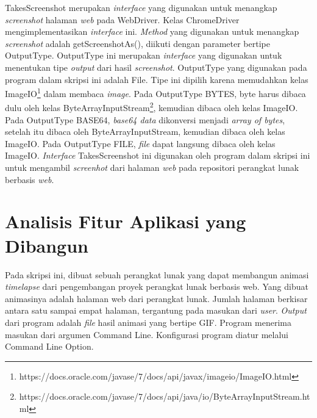 TakesScreenshot merupakan \textit{interface} yang digunakan untuk menangkap \textit{screenshot} halaman \textit{web} pada WebDriver. Kelas ChromeDriver mengimplementasikan \textit{interface} ini. \textit{Method} yang digunakan untuk menangkap \textit{screenshot} adalah getScreenshotAs(), diikuti dengan parameter bertipe OutputType. OutputType ini merupakan \textit{interface} yang digunakan untuk menentukan tipe \textit{output} dari hasil \textit{screenshot}. OutputType yang digunakan pada program dalam skripsi ini adalah File.    
Tipe ini dipilih karena memudahkan kelas ImageIO\footnote{https://docs.oracle.com/javase/7/docs/api/javax/imageio/ImageIO.html} dalam membaca \textit{image}. Pada OutputType BYTES, byte harus dibaca dulu oleh kelas ByteArrayInputStream\footnote{https://docs.oracle.com/javase/7/docs/api/java/io/ByteArrayInputStream.html}, kemudian dibaca oleh kelas ImageIO. Pada OutputType BASE64, \textit{base64 data} dikonversi menjadi \textit{array of bytes}, setelah itu dibaca oleh ByteArrayInputStream, kemudian dibaca oleh kelas ImageIO. Pada OutputType FILE, \textit{file} dapat langsung dibaca oleh kelas ImageIO. \textit{Interface} TakesScreenshot ini digunakan oleh program dalam skripsi ini untuk mengambil \textit{screenhot} dari halaman \textit{web} pada repositori perangkat lunak berbasis \textit{web}. 



\section{Analisis Fitur Aplikasi yang Dibangun}
\label{sec:analisis_fitur_aplikasi}
Pada skripsi ini, dibuat sebuah perangkat lunak yang dapat membangun animasi \textit{timelapse}
dari pengembangan proyek perangkat lunak berbasis web. Yang dibuat animasinya adalah
halaman web dari perangkat lunak. Jumlah halaman berkisar antara satu sampai empat halaman, tergantung pada masukan dari \textit{user}. \textit{Output} dari program adalah \textit{file} hasil animasi yang bertipe GIF. Program menerima masukan dari argumen Command Line. Konfigurasi program diatur melalui Command Line Option.
 

